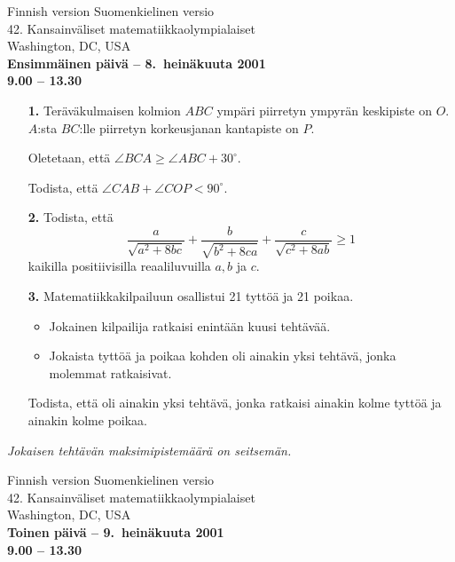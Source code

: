 \documentclass[12pt]{article}
\begin{document}
\pagestyle{empty}


\begin{center}
{Finnish version \hfill Suomenkielinen versio} \\
\bigskip
{\Large 42. Kansainv\"aliset matematiikkaolympialaiset} \\
{\large Washington, DC, USA} \\
\medskip
{\large
\textbf{Ensimm\"ainen p\"aiv\"a -- 8.\ hein\"akuuta 2001}\\

\textbf{9.00 -- 13.30}\\

}
\end{center}

\vspace{0.5in}
\begin{enumerate}
\item[\textbf{1.}]
Ter\"av\"akulmaisen kolmion $ABC$  ymp\"ari piirretyn ympyr\"an
keskipiste on $O$. $A$:sta $BC$:lle piirretyn korkeusjanan
kantapiste on $P$.

\smallskip
Oletetaan, ett\"a $\angle BCA\ge \angle ABC+30^{\circ}$.

\smallskip
Todista, ett\"a $\angle CAB+\angle COP<90^{\circ}$.

\vspace{0.5in}

\item[\textbf{2.}]
Todista, ett\"a
\[
\frac{a}{\sqrt{a^2+8bc}} + \frac{b}{\sqrt{b^2+8ca}} +
\frac{c}{\sqrt{c^2+8ab}}
\geq 1
\]
kaikilla positiivisilla reaaliluvuilla $a, b$ ja $c$.

\vspace{0.5in}
\item[\textbf{3.}]
Matematiikkakilpailuun osallistui 21 tytt\"o\"a ja 21 poikaa.
\begin{itemize}
\item
Jokainen kilpailija ratkaisi enint\"a\"an kuusi teht\"av\"a\"a.
\item
Jokaista tytt\"o\"a ja poikaa kohden oli ainakin yksi teht\"av\"a, jonka
molemmat ratkaisivat.
\end{itemize}
Todista, ett\"a oli ainakin yksi teht\"av\"a, jonka ratkaisi ainakin kolme
tytt\"o\"a ja ainakin kolme poikaa.
\end{enumerate}
\vspace{1in}\noindent \textit{Jokaisen teht\"av\"an maksimipistem\"a\"ar\"a
on seitsem\"an.}
\pagebreak


\begin{center}
{Finnish version \hfill Suomenkielinen versio}  \\
\bigskip
{\Large 42. Kansainv\"aliset matematiikkaolympialaiset} \\
{\large Washington, DC, USA} \\
\medskip
{\large
\textbf{Toinen p\"aiv\"a -- 9.\ hein\"akuuta 2001}\\

\textbf{9.00 -- 13.30}\\

}
\end{center}
\end{document}
